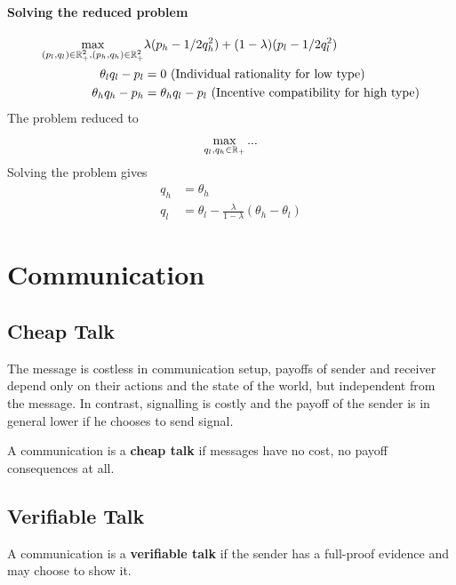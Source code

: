 \documentclass{article}
\begin{document}
   	\paragraph{Solving the reduced problem}
   	\begin{align}
   		\max_{(p_l, q_l) \in \mathbb{R}^2_+, (p_h, q_h) \in \mathbb{R}^2_+} &\lambda (p_h - 1/2 q_h^2) + (1 - \lambda) (p_l - 1/2 q_l^2) \\
   		\theta_l q_l - p_l &= 0 \text{{ (Individual rationality for low type)}} \\
   		\theta_h q_h - p_h &= \theta_h q_l - p_l \text{{ (Incentive compatibility for high type)}}
   	\end{align}
   	The problem reduced to
   	\begin{align}
   		\max_{q_l, q_h \in \mathbb{R}_+} ...
   	\end{align}
   	Solving the problem gives
   	\begin{align}
   		q_h &= \theta_h \\
   		q_l &= \theta_l - \frac{\lambda}{1 - \lambda}(\theta_h - \theta_l)
   	\end{align}
   	
   	\section{Communication}
   	\subsection{Cheap Talk}
   	\begin{remark}
   		The message is costless in communication setup, payoffs of sender and receiver depend only on their actions and the state of the world, but independent from the message. In contrast, signalling is costly and the payoff of the sender is in general lower if he chooses to send signal.
   	\end{remark}
   	
   	\begin{definition}
   		A communication is a \textbf{cheap talk} if messages have no cost, no payoff consequences at all.
   	\end{definition}
   	
   	
   	\subsection{Verifiable Talk}
   	\begin{definition}
   		A communication is a \textbf{verifiable talk} if the sender has a full-proof evidence and may choose to show it.
   	\end{definition}
   	
\end{document}
